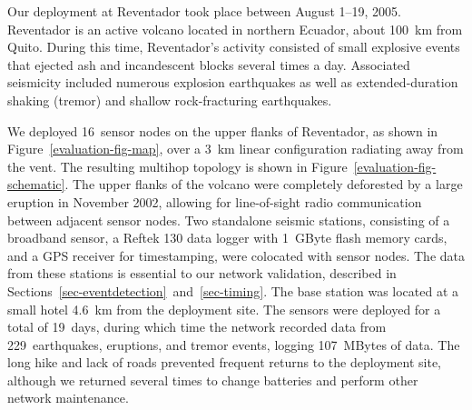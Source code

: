 
Our deployment at Reventador took place between August 1--19, 2005.
Reventador is an active volcano located in northern Ecuador, about 100~km
from Quito. 
During this time, Reventador's activity consisted of small explosive events
that ejected ash and incandescent blocks several times a day. Associated
seismicity included numerous explosion earthquakes as well as
extended-duration shaking (tremor) and shallow rock-fracturing earthquakes.

We deployed 16~sensor nodes on the upper flanks of Reventador, as
shown in Figure~\ref{evaluation-fig-map}, over a 3~km linear configuration
radiating away from the vent. The resulting multihop topology is shown
in Figure~\ref{evaluation-fig-schematic}. The upper flanks of the volcano were
completely deforested by a large eruption in November 2002, allowing
for line-of-sight radio communication between adjacent sensor nodes.
Two standalone seismic stations, consisting of a broadband sensor, a
Reftek 130 data logger with 1~GByte flash memory cards, and a GPS
receiver for timestamping, were colocated with sensor nodes. The data
from these stations is essential to our network validation, described
in Sections~\ref{sec-eventdetection}~and~\ref{sec-timing}. The base
station was located at a small hotel 4.6~km from the deployment site.
The sensors were deployed for a total of 19~days, during which time
the network recorded data from 229~earthquakes, eruptions, and tremor
events, logging 107~MBytes of data. The long hike and lack of roads
prevented frequent returns to the deployment site, although we
returned several times to change batteries and perform other network
maintenance.



